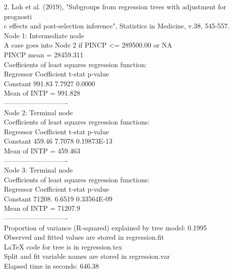\documentclass[12pt]{article}
\begin{document}
 2. Loh et al. (2019), "Subgroups from regression trees with adjustment for prognosti\\c
 effects and post-selection inference", Statistics in Medicine, v.38, 545-557.\\
  
Node 1: Intermediate node\\
 A case goes into Node 2 if PINCP <= 289500.00 or NA\\
 PINCP mean = 28459.311\\
 Coefficients of least squares regression function:\\
 Regressor    Coefficient  t-stat      p-value\\
 Constant     991.83       7.7927       0.0000    \\
 Mean of INTP = 991.828\\
 ----------------------------\\
Node 2: Terminal node\\
 Coefficients of least squares regression functions:\\
 Regressor    Coefficient  t-stat      p-value\\
 Constant     459.46       7.7078      0.19873E-13\\
 Mean of INTP = 459.463\\
 ----------------------------\\
Node 3: Terminal node\\
 Coefficients of least squares regression functions:\\
 Regressor    Coefficient  t-stat      p-value\\
 Constant     71208.       6.6519      0.33564E-09\\
 Mean of INTP = 71207.9\\
 ----------------------------\\
  
 Proportion of variance (R-squared) explained by tree model: 0.1995\\
 
 Observed and fitted values are stored in regression.fit\\
 LaTeX code for tree is in regression.tex\\
 Split and fit variable names are stored in regression.var\\
 Elapsed time in seconds: 646.38
\end{document}
